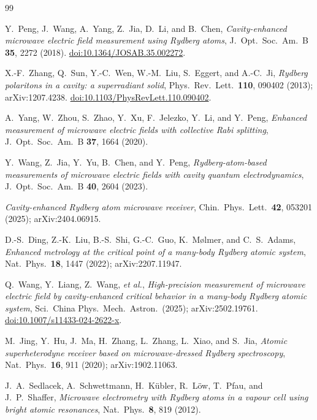 \documentclass[11pt,a4paper]{article}
\begin{document}
\begin{thebibliography}{99}
\small

 Y.~Peng, J.~Wang, A.~Yang, Z.~Jia, D.~Li, and B.~Chen,
  \emph{Cavity-enhanced microwave electric field measurement using Rydberg atoms},
  J.~Opt.~Soc.~Am.~B \textbf{35}, 2272 (2018).
  \href{https://doi.org/10.1364/JOSAB.35.002272}{doi:10.1364/JOSAB.35.002272}.

 X.-F.~Zhang, Q.~Sun, Y.-C.~Wen, W.-M.~Liu, S.~Eggert, and A.-C.~Ji,
  \emph{Rydberg polaritons in a cavity: a superradiant solid},
  Phys.~Rev.~Lett.~\textbf{110}, 090402 (2013); arXiv:1207.4238.
  \href{https://doi.org/10.1103/PhysRevLett.110.090402}{doi:10.1103/PhysRevLett.110.090402}.

 A.~Yang, W.~Zhou, S.~Zhao, Y.~Xu, F.~Jelezko, Y.~Li, and Y.~Peng,
  \emph{Enhanced measurement of microwave electric fields with collective Rabi splitting},
  J.~Opt.~Soc.~Am.~B \textbf{37}, 1664 (2020).

 Y.~Wang, Z.~Jia, Y.~Yu, B.~Chen, and Y.~Peng,
  \emph{Rydberg-atom-based measurements of microwave electric fields with cavity quantum
  electrodynamics}, J.~Opt.~Soc.~Am.~B \textbf{40}, 2604 (2023).

 \emph{Cavity-enhanced Rydberg atom microwave receiver},
  Chin.~Phys.~Lett.~\textbf{42}, 053201 (2025); arXiv:2404.06915.

 D.-S.~Ding, Z.-K.~Liu, B.-S.~Shi, G.-C.~Guo, K.~M\o{}lmer, and
  C.~S.~Adams, \emph{Enhanced metrology at the critical point of a many-body Rydberg atomic
  system}, Nat.~Phys.~\textbf{18}, 1447 (2022); arXiv:2207.11947.

 Q.~Wang, Y.~Liang, Z.~Wang, \emph{et al.},
  \emph{High-precision measurement of microwave electric field by cavity-enhanced critical
  behavior in a many-body Rydberg atomic system},
  Sci.~China Phys.~Mech.~Astron.\ (2025); arXiv:2502.19761.
  \href{https://doi.org/10.1007/s11433-024-2622-x}{doi:10.1007/s11433-024-2622-x}.

 M.~Jing, Y.~Hu, J.~Ma, H.~Zhang, L.~Zhang, L.~Xiao, and S.~Jia,
  \emph{Atomic superheterodyne receiver based on microwave-dressed Rydberg spectroscopy},
  Nat.~Phys.~\textbf{16}, 911 (2020); arXiv:1902.11063.

 J.~A.~Sedlacek, A.~Schwettmann, H.~K\"ubler, R.~L\"ow, T.~Pfau, and
  J.~P.~Shaffer, \emph{Microwave electrometry with Rydberg atoms in a vapour cell using
  bright atomic resonances}, Nat.~Phys.~\textbf{8}, 819 (2012).


\end{thebibliography}
\end{document}
